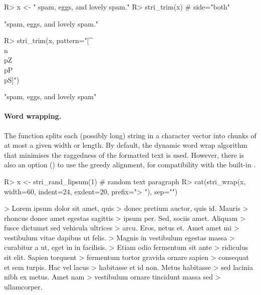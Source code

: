 \documentclass[nojss]{jss}
\begin{document}
\begin{Schunk}
\begin{Sinput}
R> x <- "      spam, eggs, and lovely spam.\n"
R> stri_trim(x)  # side="both"
\end{Sinput}
\begin{Soutput}
[1] "spam, eggs, and lovely spam."
\end{Soutput}
\begin{Sinput}
R> stri_trim(x, pattern="[^\\n\\p{Z}\\p{P}\\p{S}]")
\end{Sinput}
\begin{Soutput}
[1] "spam, eggs, and lovely spam"
\end{Soutput}
\end{Schunk}



\paragraph{Word wrapping.}
The  function splits each (possibly long)
string in a character vector into chunks of at most a given width or length.
By default, the dynamic word wrap algorithm \citep{Knuth:wrap}
that minimises the raggedness of the formatted text is used.
However, there is also an option ()
to use the greedy alignment,
for compatibility with the built-in .

\begin{Schunk}
\begin{Sinput}
R> x <- stri_rand_lipsum(1)  # random text paragraph
R> cat(stri_wrap(x, width=60, indent=24, exdent=20, prefix="> "), sep="\n")
\end{Sinput}
\begin{Soutput}
>                         Lorem ipsum dolor sit amet, quis
>                     donec pretium auctor, quis id. Mauris
>                     rhoncus donec amet egestas sagittis
>                     ipsum per. Sed, sociis amet. Aliquam
>                     fusce dictumst sed vehicula ultrices
>                     arcu. Eros, netus et. Amet amet mi
>                     vestibulum vitae dapibus ut felis.
>                     Magnis in vestibulum egestas massa
>                     curabitur a ut, eget in in facilisis.
>                     Etiam odio fermentum sit ante
>                     ridiculus sit elit. Sapien torquent
>                     fermentum tortor gravida ornare sapien
>                     consequat et sem turpis. Hac vel lacus
>                     habitasse et id non. Metus habitasse
>                     sed lacinia nibh ex metus. Amet nam
>                     vestibulum ornare tincidunt massa sed
>                     ullamcorper.
\end{Soutput}
\end{Schunk}
\end{document}
